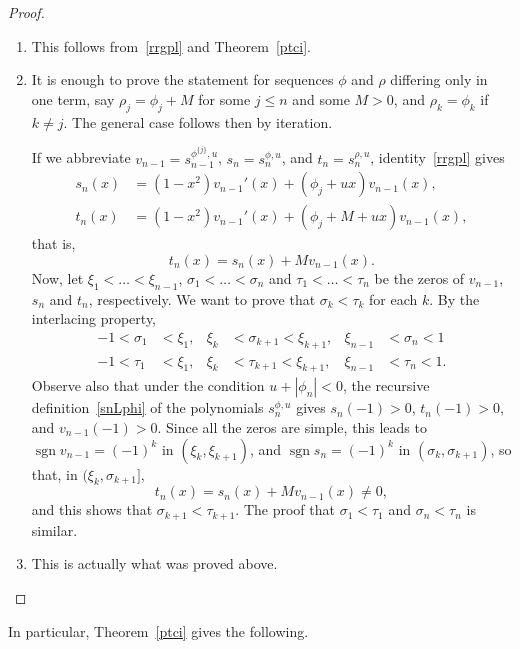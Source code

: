 \documentclass[10pt, a4paper, leqno]{amsart}
\numberwithin{equation}{section}
\theoremstyle{plain}
\theoremstyle{remark}
\newcommand{\spu}{s^{\phi,u}}
\newcommand{\sgn}{\operatorname{sgn}}
\begin{document}
\begin{proof}
\begin{enumerate}
\item This follows from~\eqref{rrgpl} and Theorem~\ref{ptci}.

\item It is enough to prove the statement for sequences $\phi$ and $\rho$ differing only in one term, say $\rho_j = \phi_j + M$ for some $j \le n$ and some $M > 0$, and $\rho_k = \phi_k$ if $k \ne j$. The general case follows then by iteration.

If we abbreviate
$v_{n-1} = s_{n-1}^{\phi^{\{j\}},u}$, $s_n = \spu_n$, and $t_n = s_n^{\rho,u}$, 
identity~\eqref{rrgpl} gives
\begin{align*}
  s_n(x) &= (1-x^2) v_{n-1}'(x) + (\phi_j + ux) v_{n-1}(x),
  \\
  t_n(x) &= (1-x^2) v_{n-1}'(x) + (\phi_j + M + ux) v_{n-1}(x),
\end{align*}
that is,
\begin{equation}
\label{mcc}
  t_n(x) = s_n(x) + M v_{n-1}(x).
\end{equation}
Now, let $\xi_1 < \dots < \xi_{n-1}$, $\sigma_1 < \dots < \sigma_n$ and $\tau_1 < \dots < \tau_n$ be the zeros of $v_{n-1}$, $s_n$ and $t_n$, respectively. We want to prove that $\sigma_k < \tau_k$ for each $k$. By the interlacing property,
\begin{align*}
  -1 < \sigma_1 &< \xi_1, & \xi_k &< \sigma_{k+1} < \xi_{k+1},
  & \xi_{n-1} &< \sigma_n < 1 \\
  -1 < \tau_1 &< \xi_1, & \xi_k &< \tau_{k+1} < \xi_{k+1},
  & \xi_{n-1} &< \tau_n < 1.
\end{align*}
Observe also that under the condition $u + |\phi_n| < 0$, the recursive definition~\eqref{snLphi} of the polynomials $s_n^{\phi,u}$ gives $s_n(-1) > 0$, $t_n(-1) > 0$, and $v_{n-1}(-1) > 0$. Since all the zeros are simple, this leads to $\sgn v_{n-1} = (-1)^k$ in $(\xi_k,\xi_{k+1})$, and $\sgn s_n = (-1)^k$ in $(\sigma_k, \sigma_{k+1})$, so that, in $(\xi_k, \sigma_{k+1}]$,
\[
  t_n(x) = s_n(x) + M v_{n-1}(x) \ne 0,
\]
and this shows that $\sigma_{k+1} < \tau_{k+1}$. The proof that $\sigma_1 < \tau_1$ and $\sigma_n < \tau_n$ is similar.

\item This is actually what was proved above.
\qedhere
\end{enumerate}
\end{proof}

In particular, Theorem~\ref{ptci} gives the following.
\end{document}
